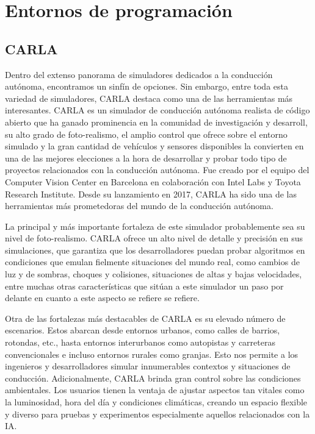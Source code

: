 \section{Entornos de programación}
\label{sec:entornos_de_programacion}


\subsection{CARLA}
\label{subsec:CARLA}

Dentro del extenso panorama de simuladores dedicados a la conducción autónoma, encontramos un sinfín de opciones. Sin embargo, entre toda esta variedad de simuladores, CARLA destaca como una de las herramientas más interesantes. CARLA es un simulador de conducción autónoma realista de código abierto que ha ganado prominencia en la comunidad de investigación y desarroll, su alto grado de foto-realismo, el amplio control que ofrece sobre el entorno simulado y la gran cantidad de vehículos y sensores disponibles la convierten en una de las mejores elecciones a la hora de desarrollar y probar todo tipo de proyectos relacionados con la conducción autónoma. Fue creado por el equipo del Computer Vision Center en Barcelona en colaboración con Intel Labs y Toyota Research Institute. Desde su lanzamiento en 2017, CARLA ha sido una de las herramientas más prometedoras del mundo de la conducción autónoma.

\bigskip 

La principal y más importante fortaleza de este simulador probablemente sea su nivel de foto-realismo. CARLA ofrece un alto nivel de detalle y precisión en sus simulaciones, que garantiza que los desarrolladores puedan probar algoritmos en condiciones que emulan fielmente situaciones del mundo real, como cambios de luz y de sombras, choques y colisiones, situaciones de altas y bajas velocidades, entre muchas otras características que sitúan a este simulador un paso por delante en cuanto a este aspecto se refiere se refiere.

\bigskip

Otra de las fortalezas más destacables de CARLA es su elevado número de escenarios. Estos abarcan desde entornos urbanos, como calles de barrios, rotondas, etc., hasta entornos interurbanos como autopistas y carreteras convencionales e incluso entornos rurales como granjas. Esto nos permite a los ingenieros y desarrolladores simular innumerables contextos y situaciones de conducción. Adicionalmente, CARLA brinda gran control sobre las condiciones ambientales. Los usuarios tienen la ventaja de ajustar aspectos tan vitales como la luminosidad, hora del día y condiciones climáticas, creando un espacio flexible y diverso para pruebas y experimentos especialmente aquellos relacionados con la \ac{IA}.

